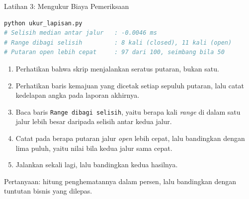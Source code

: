 \documentclass[aspectratio=169, table, 12pt]{beamer}
\begin{document}
\begin{frame}[fragile]{{\Large Latihan 3: Mengukur Biaya Pemeriksaan}}
  \vspace{3pt}
\begin{lstlisting}[language=bash, basicstyle=\ttfamily\tiny]
python ukur_lapisan.py
# Selisih median antar jalur   : -0.0046 ms
# Range dibagi selisih         : 8 kali (closed), 11 kali (open)
# Putaran open lebih cepat     : 97 dari 100, seimbang bila 50
\end{lstlisting}

  \vspace{3pt}
  \begin{enumerate}
    \item Perhatikan bahwa skrip menjalankan seratus putaran, bukan satu.
    \item Perhatikan baris kemajuan yang dicetak setiap sepuluh putaran, lalu
          catat kedelapan angka pada laporan akhirnya.
    \item Baca baris \texttt{Range dibagi selisih}, yaitu berapa kali \textit{range} di
          dalam satu jalur lebih besar daripada selisih antar kedua jalur.
    \item Catat pada berapa putaran jalur \textit{open} lebih cepat, lalu bandingkan
          dengan lima puluh, yaitu nilai bila kedua jalur sama cepat.
    \item Jalankan sekali lagi, lalu bandingkan kedua hasilnya.
  \end{enumerate}

  \vspace{3pt}
  {\small Pertanyaan: hitung penghematannya dalam persen, lalu bandingkan
  dengan tuntutan bisnis yang dilepas.}
\end{frame}
\end{document}
